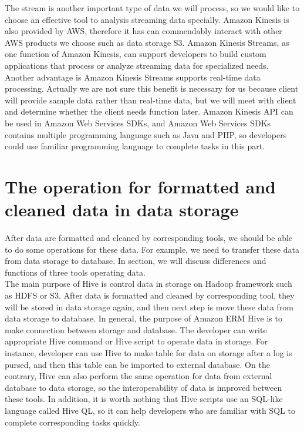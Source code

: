 \documentclass[10pt,draftclsnofoot,onecolumn,journal,compsoc]{IEEEtran}
\begin{document}
        \noindent The stream is another important type of data we will process, so we would like to choose an effective tool to analysis streaming data specially. Amazon Kinesis is also provided by AWS, therefore it has can commendably interact with other AWS products we choose such as data storage S3. Amazon Kinesis Streams, as one function of Amazon Kinesis, can support developers to build custom applications that process or analyze streaming data for specialized needs\cite{Z6}. Another advantage is Amazon Kinesis Streams supports real-time data processing. Actually we are not sure this benefit is necessary for us because client will provide sample data rather than real-time data, but we will meet with client and determine whether the client needs function later. Amazon Kinesis API can be used in Amazon Web Services SDKs, and Amazon Web Services SDKs contains multiple programming language such as Java and PHP, so developers could use familiar programming language to complete tasks in this part.\\
        \section{The operation for formatted and cleaned data in data storage}
        After data are formatted and cleaned by corresponding tools, we should be able to do some operations for these data. For example, we need to transfer these data from data storage to database. In section, we will discuss differences and functions of three tools operating data.\\

        \noindent The main purpose of Hive is control data in storage on Hadoop framework such as HDFS or S3. After data is formatted and cleaned by corresponding tool, they will be stored in data storage again, and then next step is move these data from data storage to database. In general, the purpose of Amazon ERM Hive is to make connection between storage and database. The developer can write appropriate Hive command or Hive script to operate data in storage. For instance, developer can use Hive to make table for data on storage after a log is pursed, and then this table can be imported to external database. On the contrary, Hive can also perform the same operation for data from external database to data storage, so the interoperability of data is improved between these tools. In addition, it is worth nothing that Hive scripts use an SQL-like language called Hive QL\cite{Z7}, so it can help developers who are familiar with SQL to complete corresponding tasks quickly.\\
\end{document}
